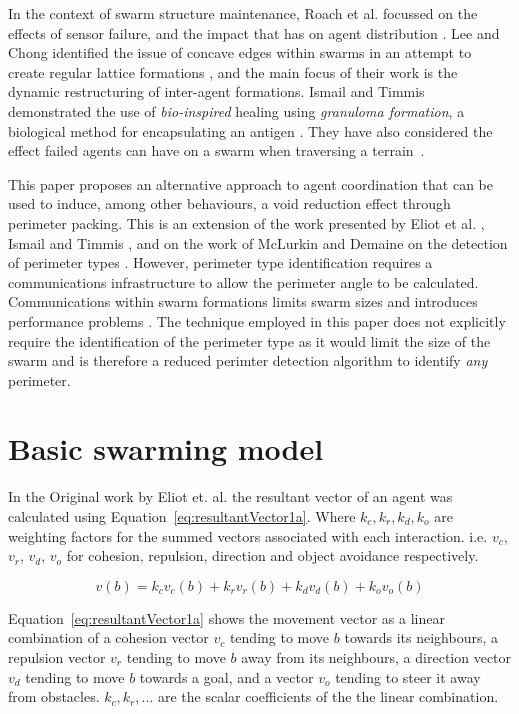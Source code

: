 \documentclass[12pt,a4paper]{IEEEtran}
\newcommand{\kc}{\mathit{k_c}}
\newcommand{\kr}{\mathit{k_r}}
\newcommand{\kd}{\mathit{k_d}}
\newcommand{\ko}{\mathit{k_o}}
\begin{document}
In the context of swarm structure maintenance, Roach et al. focussed on the effects of sensor failure, and the impact that has on agent distribution \cite{RMT:15}. Lee and Chong identified the issue of concave edges within swarms in an attempt to create regular lattice formations \cite{GN:08}, and the main focus of their work is the dynamic restructuring of inter-agent formations. Ismail and Timmis demonstrated the use of \textit{bio-inspired} healing using \textit{granuloma formation}, a biological method for encapsulating an antigen \cite{IT:10}. They have also considered the effect failed agents can have on a swarm when traversing a terrain~\cite{TIBW:16}. 

This paper proposes an alternative approach to agent coordination that can be used to induce, among other behaviours, a void reduction effect through perimeter packing. This is an extension of the work presented by Eliot et al. \cite{eliot2019void}, Ismail and Timmis \cite{IT:10,TIBW:16}, and on the work of McLurkin and Demaine on the detection of perimeter types \cite{mclurkin2009}. However, perimeter type identification requires a communications infrastructure to allow the perimeter angle to be calculated. Communications within swarm formations limits swarm sizes and introduces performance problems \cite{fu2020formation}. The technique employed in this paper does not explicitly require the identification of the perimeter type as it would limit the size of the swarm\cite{eliot2019void,GN:08} and is therefore a reduced perimter detection algorithm to identify \textit{any} perimeter.

\section{Basic swarming model}\label{sec:basicModel}
In the Original work by Eliot et. al. the resultant vector of an agent was calculated using Equation~\ref{eq:resultantVector1a}. Where $\kc, \kr, k_d, k_o$ are weighting factors for the summed vectors associated with each interaction. i.e. $v_c$, $v_r$, $v_d$, $v_o$ for cohesion, repulsion, direction and object avoidance respectively. 

\begin{equation}\label{eq:resultantVector1a}
	v(b) = \kc v_c(b) + \kr v_r(b) + \kd v_d(b) + \ko v_o(b)
\end{equation}

Equation~\ref{eq:resultantVector1a} shows the movement vector as a linear combination of a cohesion vector $v_c$ tending to move $b$ towards its neighbours, a repulsion vector $v_r$ tending to move $b$ away from its neighbours, a direction vector  $v_d$ tending to move $b$ towards a goal, and a vector $v_o$ tending to steer it away from obstacles. $\kc, \kr, ...$ are the scalar coefficients of the the linear combination.
\end{document}
